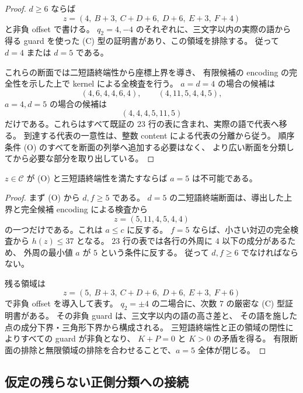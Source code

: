 \begin{proof}
\leanok
$d\geq6$ ならば
\[
 z=(4,\ B+3,\ C+D+6,\ D+6,\ E+3,\ F+4)
\]
と非負 offset で書ける。
$q_2=4,-4$ のそれぞれに、三文字以内の実際の語から得る guard を使った
(C) 型の証明書があり、この領域を排除する。
従って $d=4$ または $d=5$ である。

これらの断面では二短語終端性から座標上界を導き、
有限候補の encoding の完全性を示した上で kernel による全検査を行う。
$a=d=4$ の場合の候補は
\[
 (4,6,4,4,6,4),\qquad (4,11,5,4,4,5),
\]
$a=4,d=5$ の場合の候補は
\[
 (4,4,4,5,11,5)
\]
だけである。これらはすべて既証の $23$ 行の表に含まれ、実際の語で代表へ移る。
到達する代表の一意性は、整数 content による代表の分離から従う。
順序条件 (O) のすべてを断面の列挙へ追加する必要はなく、
より広い断面を分類してから必要な部分を取り出している。
\end{proof}

\begin{proposition}
\label{bp:pos-five}
\leanok
$z\in\mathcal C$ が (O) と三短語終端性を満たすならば $a=5$ は不可能である。
\end{proposition}

\begin{proof}
\leanok
まず (O) から $d,f\geq5$ である。
$d=5$ の二短語終端断面は、導出した上界と完全候補 encoding による検査から
\[
 z=(5,11,4,5,4,4)
\]
の一つだけである。これは $a\leq c$ に反する。
$f=5$ ならば、小さい対辺の完全検査から $h(z)\leq37$ となる。
$23$ 行の表では各行の外周に $4$ 以下の成分があるため、
外周の最小値 $a$ が $5$ という条件に反する。
従って $d,f\geq6$ でなければならない。

残る領域は
\[
 z=(5,\ B+3,\ C+D+6,\ D+6,\ E+3,\ F+6)
\]
で非負 offset を導入して表す。
$q_2=\pm4$ の二場合に、次数 $7$ の厳密な (C) 型証明書がある。
その非負 guard は、三文字以内の語の高さ差と、
その語を施した点の成分下界・三角形下界から構成される。
三短語終端性と正の領域の閉性によりすべての guard が非負となり、
$K+P=0$ と $K>0$ の矛盾を得る。
有限断面の排除と無限領域の排除を合わせることで、$a=5$ 全体が閉じる。
\end{proof}

\subsection{仮定の残らない正側分類への接続}

